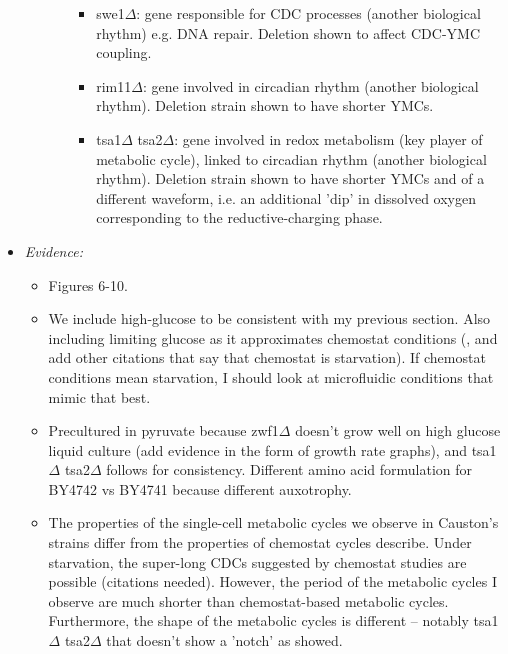 \begin{itemize}
\begin{itemize}
\begin{itemize}
\begin{itemize}
\item swe1\(\Delta\): gene responsible for CDC processes (another biological rhythm) e.g. DNA repair.  Deletion shown to affect CDC-YMC coupling.
\item rim11\(\Delta\): gene involved in circadian rhythm (another biological rhythm).  Deletion strain shown to have shorter YMCs.
\item tsa1\(\Delta\) tsa2\(\Delta\): gene involved in redox metabolism (key player of metabolic cycle), linked to circadian rhythm (another biological rhythm).  Deletion strain shown to have shorter YMCs and of a different waveform, i.e. an additional 'dip' in dissolved oxygen corresponding to the reductive-charging phase.
\end{itemize}
\end{itemize}
\end{itemize}
\item \emph{Evidence:}
\begin{itemize}
\item Figures 6-10.
\item We include high-glucose to be consistent with my previous section.  Also including limiting glucose as it approximates chemostat conditions (\cite{jonesCyberneticModelGrowth1999}, and add other citations that say that chemostat is starvation).  If chemostat conditions mean starvation, I should look at microfluidic conditions that mimic that best.
\item Precultured in pyruvate because zwf1\(\Delta\) doesn't grow well on high glucose liquid culture (add evidence in the form of growth rate graphs), and tsa1\(\Delta\) tsa2\(\Delta\) follows for consistency.  Different amino acid formulation for BY4742 vs BY4741 because different auxotrophy.
\item The properties of the single-cell metabolic cycles we observe in Causton's strains differ from the properties of chemostat cycles \cite{caustonMetabolicCyclesYeast2015} describe.  Under starvation, the super-long CDCs suggested by chemostat studies are possible (citations needed).  However, the period of the metabolic cycles I observe are much shorter than chemostat-based metabolic cycles.  Furthermore, the shape of the metabolic cycles is different -- notably tsa1\(\Delta\) tsa2\(\Delta\) that doesn't show a 'notch' as \cite{caustonMetabolicCyclesYeast2015} showed.
\end{itemize}


\end{itemize}
